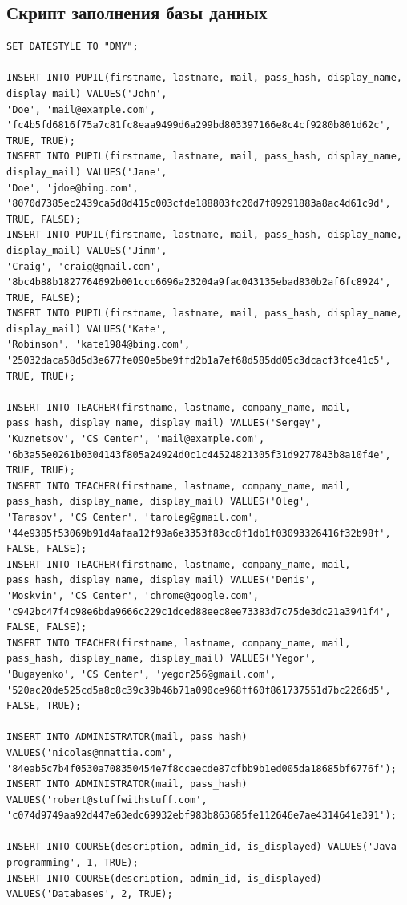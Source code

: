 \documentclass[11pt]{article}
\begin{document}
\subsection{Скрипт заполнения базы данных}
\label{sec:orgb4c4811}
\begin{verbatim}
SET DATESTYLE TO "DMY";

INSERT INTO PUPIL(firstname, lastname, mail, pass_hash, display_name, display_mail) VALUES('John',
'Doe', 'mail@example.com', 'fc4b5fd6816f75a7c81fc8eaa9499d6a299bd803397166e8c4cf9280b801d62c', TRUE, TRUE);
INSERT INTO PUPIL(firstname, lastname, mail, pass_hash, display_name, display_mail) VALUES('Jane',
'Doe', 'jdoe@bing.com', '8070d7385ec2439ca5d8d415c003cfde188803fc20d7f89291883a8ac4d61c9d', TRUE, FALSE);
INSERT INTO PUPIL(firstname, lastname, mail, pass_hash, display_name, display_mail) VALUES('Jimm',
'Craig', 'craig@gmail.com', '8bc4b88b1827764692b001ccc6696a23204a9fac043135ebad830b2af6fc8924', TRUE, FALSE);
INSERT INTO PUPIL(firstname, lastname, mail, pass_hash, display_name, display_mail) VALUES('Kate',
'Robinson', 'kate1984@bing.com', '25032daca58d5d3e677fe090e5be9ffd2b1a7ef68d585dd05c3dcacf3fce41c5', TRUE, TRUE);

INSERT INTO TEACHER(firstname, lastname, company_name, mail, pass_hash, display_name, display_mail) VALUES('Sergey',
'Kuznetsov', 'CS Center', 'mail@example.com', '6b3a55e0261b0304143f805a24924d0c1c44524821305f31d9277843b8a10f4e', TRUE, TRUE);
INSERT INTO TEACHER(firstname, lastname, company_name, mail, pass_hash, display_name, display_mail) VALUES('Oleg',
'Tarasov', 'CS Center', 'taroleg@gmail.com', '44e9385f53069b91d4afaa12f93a6e3353f83cc8f1db1f03093326416f32b98f', FALSE, FALSE);
INSERT INTO TEACHER(firstname, lastname, company_name, mail, pass_hash, display_name, display_mail) VALUES('Denis',
'Moskvin', 'CS Center', 'chrome@google.com', 'c942bc47f4c98e6bda9666c229c1dced88eec8ee73383d7c75de3dc21a3941f4', FALSE, FALSE);
INSERT INTO TEACHER(firstname, lastname, company_name, mail, pass_hash, display_name, display_mail) VALUES('Yegor',
'Bugayenko', 'CS Center', 'yegor256@gmail.com', '520ac20de525cd5a8c8c39c39b46b71a090ce968ff60f861737551d7bc2266d5', FALSE, TRUE);

INSERT INTO ADMINISTRATOR(mail, pass_hash) VALUES('nicolas@nmattia.com', '84eab5c7b4f0530a708350454e7f8ccaecde87cfbb9b1ed005da18685bf6776f');
INSERT INTO ADMINISTRATOR(mail, pass_hash) VALUES('robert@stuffwithstuff.com', 'c074d9749aa92d447e63edc69932ebf983b863685fe112646e7ae4314641e391');

INSERT INTO COURSE(description, admin_id, is_displayed) VALUES('Java programming', 1, TRUE);
INSERT INTO COURSE(description, admin_id, is_displayed) VALUES('Databases', 2, TRUE);


\end{verbatim}
\end{document}
